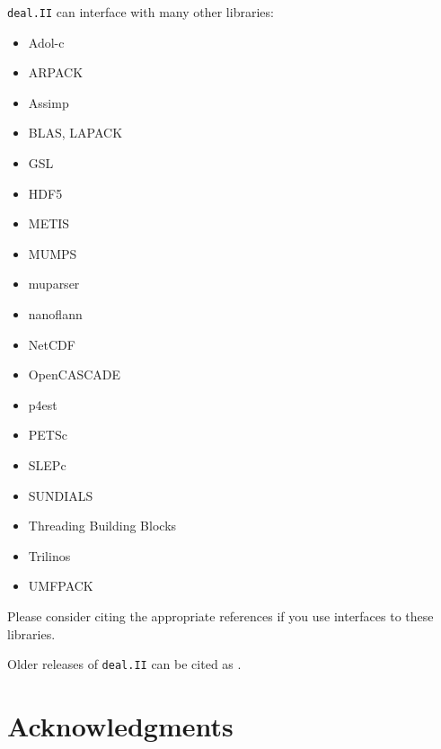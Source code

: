 \documentclass{ansarticle-preprint}
\newcommand{\specialword}[1]{\texttt{#1}}
\newcommand{\dealii}{{\specialword{deal.II}}}
\begin{document}
\dealii{} can interface with many other libraries:
\begin{multicols}{2}
\begin{itemize}
\item Adol-c \cite{adol-c}
\item ARPACK \cite{arpack}
\item Assimp \cite{assimp}
\item BLAS, LAPACK
\item GSL \cite{gsl2016}
\item HDF5 \cite{hdf5}
\item METIS \cite{karypis1998fast}
\item MUMPS \cite{ADE00,MUMPS:1,MUMPS:2,mumps-web-page}
\item muparser \cite{muparser-web-page}
\item nanoflann \cite{nanoflann}
\item NetCDF \cite{rew1990netcdf}
\item OpenCASCADE \cite{opencascade-web-page}
\item p4est \cite{p4est}
\item PETSc \cite{petsc-user-ref,petsc-web-page}
\item SLEPc \cite{Hernandez:2005:SSF}
\item SUNDIALS \cite{sundials}
\item Threading Building Blocks \cite{Rei07}
\item Trilinos \cite{trilinos,trilinos-web-page}
\item UMFPACK \cite{umfpack}
\end{itemize}
\end{multicols}
Please consider citing the appropriate references if you use interfaces to these
libraries.

Older releases of \dealii{} can be cited as \cite{dealII80,dealII81,dealII82,dealII83,dealII84,dealII85}.

\nocite{BangerthKanschat1999}

\section{Acknowledgments}
\end{document}

